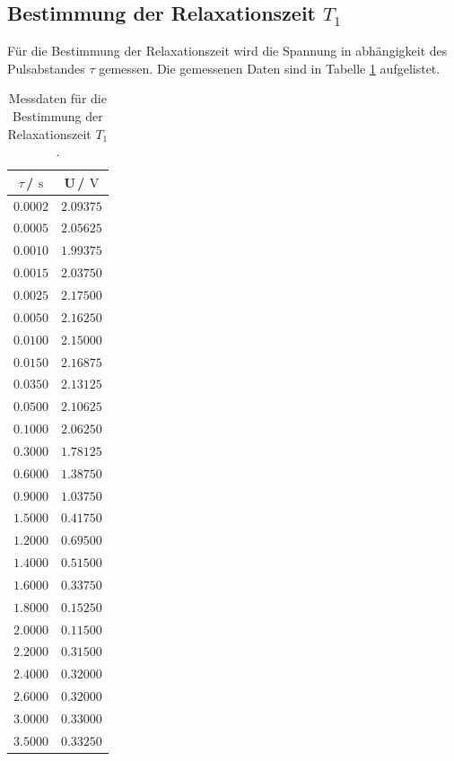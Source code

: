 \subsection{Bestimmung der Relaxationszeit $T_{\text{1}}$}
Für die Bestimmung der Relaxationszeit wird die Spannung in abhängigkeit des Pulsabstandes $\tau$ gemessen.
Die gemessenen Daten sind in Tabelle \ref{tab:T1_Data} aufgelistet.
\begin{table}
  \centering
  \caption{Messdaten für die Bestimmung der Relaxationszeit $T_{\text{1}}$.}
  \label{tab:T1_Data}
  \begin{tabular}{c c}
    \toprule
    $\tau$\,/\,$\SI{}{\second}$&U\,/\,$\SI{}{\volt}$\\
    \midrule
    $\num{0.0002}$&$\num{2.09375}$\\
    $\num{0.0005}$&$\num{2.05625}$\\
    $\num{0.0010}$&$\num{1.99375}$\\
    $\num{0.0015}$&$\num{2.03750}$\\
    $\num{0.0025}$&$\num{2.17500}$\\
    $\num{0.0050}$&$\num{2.16250}$\\
    $\num{0.0100}$&$\num{2.15000}$\\
    $\num{0.0150}$&$\num{2.16875}$\\
    $\num{0.0350}$&$\num{2.13125}$\\
    $\num{0.0500}$&$\num{2.10625}$\\
    $\num{0.1000}$&$\num{2.06250}$\\
    $\num{0.3000}$&$\num{1.78125}$\\
    $\num{0.6000}$&$\num{1.38750}$\\
    $\num{0.9000}$&$\num{1.03750}$\\
    $\num{1.5000}$&$\num{0.41750}$\\
    $\num{1.2000}$&$\num{0.69500}$\\
    $\num{1.4000}$&$\num{0.51500}$\\
    $\num{1.6000}$&$\num{0.33750}$\\
    $\num{1.8000}$&$\num{0.15250}$\\
    $\num{2.0000}$&$\num{0.11500}$\\
    $\num{2.2000}$&$\num{0.31500}$\\
    $\num{2.4000}$&$\num{0.32000}$\\
    $\num{2.6000}$&$\num{0.32000}$\\
    $\num{3.0000}$&$\num{0.33000}$\\
    $\num{3.5000}$&$\num{0.33250}$\\
    \bottomrule
  \end{tabular}
\end{table}
